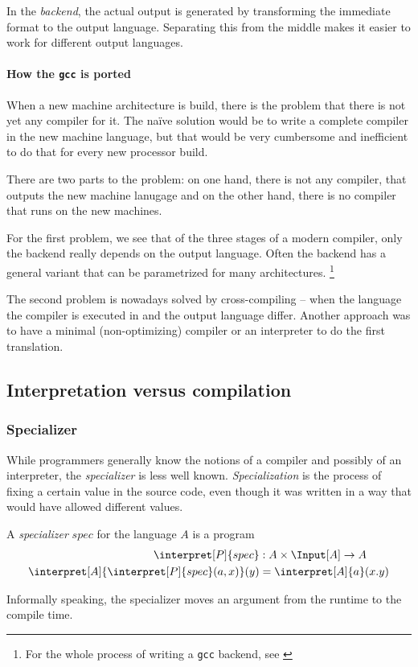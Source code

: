 In the {\em backend}, the actual output is generated by transforming the 
immediate format to the output language. Separating this from the middle 
makes it easier to work for different output languages.

\paragraph{How the {\tt gcc} is ported} %
\label{par:gcc}
When a new machine architecture is build, there is the problem that there is 
not yet any compiler for it. The naïve solution would be to write a complete 
compiler in the new machine language, but that would be very cumbersome and 
inefficient to do that for every new processor build.

There are two parts to the problem: on one hand, there is not any compiler, 
that outputs the new machine lanugage and on the other hand, there is no 
compiler that runs on the new machines.

For the first problem, we see that of the three stages of a modern compiler,
only the backend really depends on the output language. Often the backend has 
a general variant that can be parametrized for many architectures.
\footnote{For the whole process of writing a {\tt gcc} backend, see \cite{nilsson2000porting}}

The second problem is nowadays solved by cross-compiling -- when the language 
the compiler is executed in and the output language differ. Another approach 
was to have a minimal (non-optimizing) compiler or an interpreter to do the 
first translation.

\subsection{Interpretation versus compilation}

\subsubsection{Specializer} %
\label{sub:Specializer}
While programmers generally know the notions of a compiler and possibly of an 
interpreter, the {\em specializer} is less well known. {\em Specialization} 
is the process of fixing a certain value in the source code, even though it 
was written in a way that would have allowed different values. 

\begin{defn}
	A {\em specializer} $spec$ for the language $A$ is a program 
	\begin{align*}
		\interpret[P]{spec}&:A\times \Input[A]\rightarrow A \\
		\interpret[A]{\interpret[P]{spec}(a, x)}(y) &= \interpret[A]{a}(x.y)
	\end{align*}

	Informally speaking, the specializer moves an argument from the runtime to 
	the compile time.
\end{defn}


